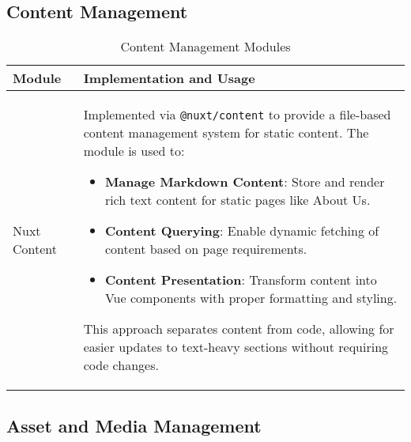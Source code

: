 \subsection{Content Management}

\begin{table}[H]
    \centering
    \setlength{\tabcolsep}{5pt}
    \renewcommand{\arraystretch}{1.2} 
    \begin{tabular}{|p{3.5cm}|p{10.8cm}|}
        \hline
        \rowcolor{bluepoli!20}
        \textbf{Module} & \textbf{Implementation and Usage} \\
        \hline
        Nuxt Content & 
        Implemented via \texttt{@nuxt/content} to provide a file-based content management system for static content. The module is used to:
        \begin{itemize}
            \item \textbf{Manage Markdown Content}: Store and render rich text content for static pages like About Us.
            \item \textbf{Content Querying}: Enable dynamic fetching of content based on page requirements.
            \item \textbf{Content Presentation}: Transform content into Vue components with proper formatting and styling.
        \end{itemize}
        This approach separates content from code, allowing for easier updates to text-heavy sections without requiring code changes.
        \\
        \hline
    \end{tabular}
    \caption{Content Management Modules}
\end{table}

\subsection{Asset and Media Management}

